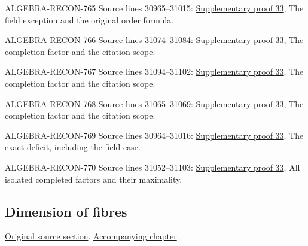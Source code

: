 \begin{AlgebraSourceRoutes}
\item[ALGEBRA-RECON-765] Source lines 30965--31015: \hyperlink{algebra_zariski_applications_notes_20260928}{Supplementary proof 33}, The field exception and the original order formula.
\item[ALGEBRA-RECON-766] Source lines 31074--31084: \hyperlink{algebra_zariski_applications_notes_20260928}{Supplementary proof 33}, The completion factor and the citation scope.
\item[ALGEBRA-RECON-767] Source lines 31094--31102: \hyperlink{algebra_zariski_applications_notes_20260928}{Supplementary proof 33}, The completion factor and the citation scope.
\item[ALGEBRA-RECON-768] Source lines 31065--31069: \hyperlink{algebra_zariski_applications_notes_20260928}{Supplementary proof 33}, The completion factor and the citation scope.
\item[ALGEBRA-RECON-769] Source lines 30964--31016: \hyperlink{algebra_zariski_applications_notes_20260928}{Supplementary proof 33}, The exact deficit, including the field case.
\item[ALGEBRA-RECON-770] Source lines 31052--31103: \hyperlink{algebra_zariski_applications_notes_20260928}{Supplementary proof 33}, All isolated completed factors and their maximality.
\end{AlgebraSourceRoutes}

\subsection{Dimension of fibres}
\hypertarget{algebra-source-section-dimension-fibres}{}
\noindent\href{https://github.com/stacks/stacks-project/blob/a04446e57ec1fbc252a871afcec7752fb2807b14/algebra.tex\#L31140}{Original source section}. \href{algebra.pdf\#nameddest=section-dimension-fibres}{Accompanying chapter}.

